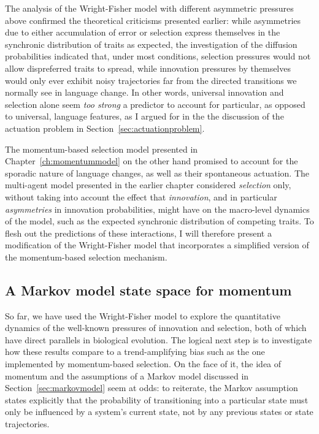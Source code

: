 The analysis of the Wright-Fisher model with different asymmetric pressures above confirmed the theoretical criticisms presented earlier: while asymmetries due to either accumulation of error or selection express themselves in the synchronic distribution of traits as expected, the investigation of the diffusion probabilities indicated that, under most conditions, selection pressures would not allow dispreferred traits to spread, while innovation pressures by themselves would only ever exhibit noisy trajectories far from the directed transitions we normally see in language change.
In other words, universal innovation and selection alone seem \emph{too strong} a predictor to account for particular, as opposed to universal, language features, as I argued for in the the discussion of the actuation problem in Section~\ref{sec:actuationproblem}.

The momentum-based selection model presented in Chapter~\ref{ch:momentummodel} on the other hand promised to account for the sporadic nature of language changes, as well as their spontaneous actuation. The multi-agent model presented in the earlier chapter considered \emph{selection} only, without taking into account the effect that \emph{innovation}, and in particular \emph{asymmetries} in innovation probabilities, might have on the macro-level dynamics of the model, such as the expected synchronic distribution of competing traits. To flesh out the predictions of these interactions, I will therefore present a modification of the Wright-Fisher model that incorporates a simplified version of the momentum-based selection mechanism.

\subsection{A Markov model state space for momentum}

So far, we have used the Wright-Fisher model to explore the quantitative dynamics of the well-known pressures of innovation and selection, both of which have direct parallels in biological evolution. The logical next step is to investigate how these results compare to a trend-amplifying bias such as the one implemented by momentum-based selection. On the face of it, the idea of momentum and the assumptions of a Markov model discussed in Section~\ref{sec:markovmodel} seem at odds: to reiterate, the Markov assumption states explicitly that the probability of transitioning into a particular state must only be influenced by a system's current state, not by any previous states or state trajectories.

